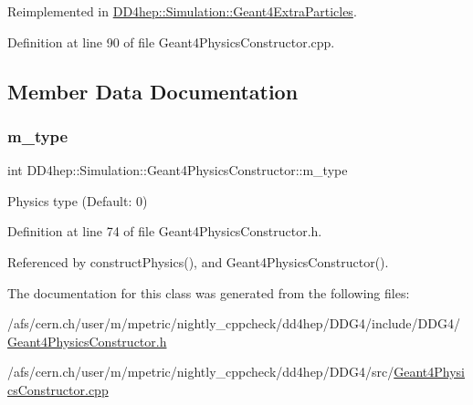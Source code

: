 Reimplemented in \hyperlink{class_d_d4hep_1_1_simulation_1_1_geant4_extra_particles_aa87e3c12da9259e49a15a35a5c76698c}{D\+D4hep\+::\+Simulation\+::\+Geant4\+Extra\+Particles}.



Definition at line 90 of file Geant4\+Physics\+Constructor.\+cpp.



\subsection{Member Data Documentation}
\hypertarget{class_d_d4hep_1_1_simulation_1_1_geant4_physics_constructor_ac262f2205619b69465908a66dc16b296}{}\label{class_d_d4hep_1_1_simulation_1_1_geant4_physics_constructor_ac262f2205619b69465908a66dc16b296} 
\subsubsection{\texorpdfstring{m\+\_\+type}{m\_type}}
{\footnotesize\ttfamily int D\+D4hep\+::\+Simulation\+::\+Geant4\+Physics\+Constructor\+::m\+\_\+type\hspace{0.3cm}{\ttfamily [protected]}}



Physics type (Default\+: 0) 



Definition at line 74 of file Geant4\+Physics\+Constructor.\+h.



Referenced by construct\+Physics(), and Geant4\+Physics\+Constructor().



The documentation for this class was generated from the following files\+:\begin{DoxyCompactItemize}
\item 
/afs/cern.\+ch/user/m/mpetric/nightly\+\_\+cppcheck/dd4hep/\+D\+D\+G4/include/\+D\+D\+G4/\hyperlink{_geant4_physics_constructor_8h}{Geant4\+Physics\+Constructor.\+h}\item 
/afs/cern.\+ch/user/m/mpetric/nightly\+\_\+cppcheck/dd4hep/\+D\+D\+G4/src/\hyperlink{_geant4_physics_constructor_8cpp}{Geant4\+Physics\+Constructor.\+cpp}\end{DoxyCompactItemize}
